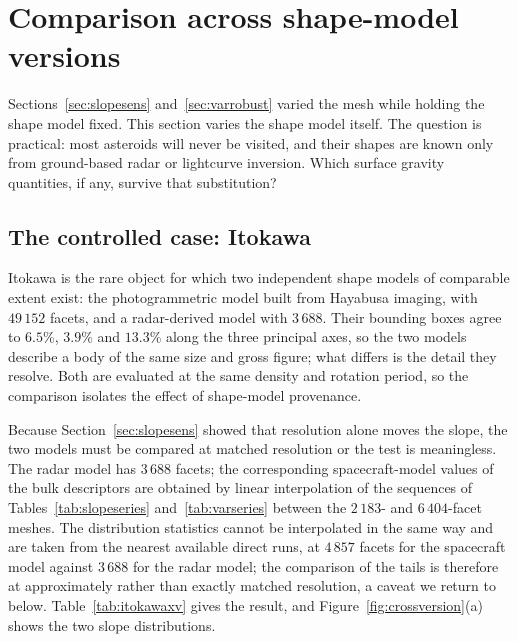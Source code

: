 \section{Comparison across shape-model versions}
\label{sec:crossversion}

Sections~\ref{sec:slopesens} and~\ref{sec:varrobust} varied the mesh while
holding the shape model fixed. This section varies the shape model itself. The
question is practical: most asteroids will never be visited, and their shapes
are known only from ground-based radar or lightcurve inversion. Which surface
gravity quantities, if any, survive that substitution?

\subsection{The controlled case: Itokawa}
\label{sec:itokawaxv}

Itokawa is the rare object for which two independent shape models of comparable
extent exist: the photogrammetric model built from Hayabusa imaging, with
$49\,152$ facets, and a radar-derived model with $3\,688$. Their bounding boxes
agree to $6.5\%$, $3.9\%$ and $13.3\%$ along the three principal axes, so the
two models describe a body of the same size and gross figure; what differs is
the detail they resolve. Both are evaluated at the same density and rotation
period, so the comparison isolates the effect of shape-model provenance.

Because Section~\ref{sec:slopesens} showed that resolution alone moves the
slope, the two models must be compared at matched resolution or the test is
meaningless. The radar model has $3\,688$ facets; the corresponding
spacecraft-model values of the bulk descriptors are obtained by linear
interpolation of the sequences of Tables~\ref{tab:slopeseries}
and~\ref{tab:varseries} between the $2\,183$- and $6\,404$-facet meshes. The
distribution statistics cannot be interpolated in the same way and are taken
from the nearest available direct runs, at $4\,857$ facets for the spacecraft
model against $3\,688$ for the radar model; the comparison of the tails is
therefore at approximately rather than exactly matched resolution, a caveat we
return to below. Table~\ref{tab:itokawaxv} gives the result, and
Figure~\ref{fig:crossversion}(a) shows the two slope distributions.

